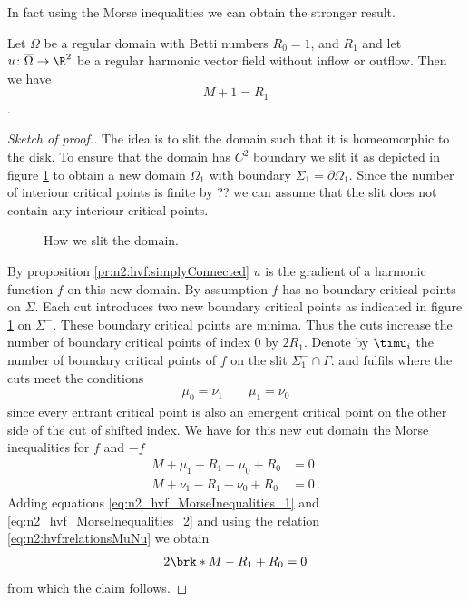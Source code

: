 In fact using the Morse inequalities we can obtain the stronger result.
\begin{proposition}
  Let $\Omega$ be a regular domain with Betti numbers $R_0=1$, and $R_1$ and let $u\colon\overline{\Omega}\to\R^2$ be 
  a regular harmonic vector field without inflow or outflow.
  Then we have $$M+1=R_1$$.
\end{proposition}
\begin{proof}[Sketch of proof.]
  The idea is to slit the domain such that it is homeomorphic to the disk.
  To ensure that the domain has $C^2$ boundary we slit it as depicted in
  figure \ref{fi:n2_hvf_slitDomain} to obtain a new domain $\Omega_1$ with boundary
  $\Sigma_1=\partial\Omega_1$.
  Since the number of interiour critical points is finite by ??
  we can assume that the slit does not contain any interiour critical points.
  \begin{figure}
    \centering
    
    \caption{How we slit the domain.}
    \label{fi:n2_hvf_slitDomain}
  \end{figure}
  By proposition \ref{pr:n2:hvf:simplyConnected}
  $u$ is the gradient of a harmonic function $f$ on this new domain.
  By assumption $f$ has no boundary critical points on $\Sigma$.
  Each cut introduces two new boundary critical points as indicated in figure 
  \ref{fi:n2_hvf_slitDomain} on $\Sigma^-$. These boundary critical points are minima.
  Thus the cuts increase the number of boundary critical points of index $0$ by $2R_1$.
  Denote by $\timu_i$ the number of boundary critical points of $f$ on the slit $\Sigma_1^-\cap\Gamma$.
   and fulfils where the cuts meet the conditions
  \begin{align}
    \mu_0=\nu_1 \qquad \mu_1=\nu_0 \label{eq:n2:hvf:relationsMuNu}
  \end{align}
  since every entrant critical point is also an emergent critical point on the other side of the cut of shifted index.
  We have for this new cut domain the Morse inequalities for $f$ and $-f$
  \begin{align}
    M+\mu_1-R_1-\mu_0+R_0&=0 \label{eq:n2_hvf_MorseInequalities_1}\\
    M+\nu_1-R_1-\nu_0+R_0&=0\,. \label{eq:n2_hvf_MorseInequalities_2}
  \end{align}
  Adding equations \eqref{eq:n2_hvf_MorseInequalities_1} and \eqref{eq:n2_hvf_MorseInequalities_2} and using the relation
  \eqref{eq:n2:hvf:relationsMuNu} we obtain
  \begin{align*}
    2\brk*{M-R_1+R_0}=0
  \end{align*}
  from which the claim follows.
\end{proof}
